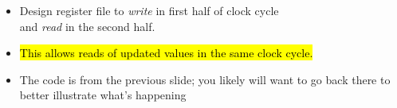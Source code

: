 \begin{frame}[fragile]
	\begin{itemize}
		\item Design register file to {\em write} in first half of clock cycle \\
			and {\em read} in the second half.


   \item \hl {This allows reads of updated values in the same clock cycle.}

	\end{itemize}
\BNotes\ifnum{}
\begin{itemize}
\item The code is from the previous slide; you likely will want to go back
	there to better illustrate what's happening
\end{itemize}
\fi\ENotes

\end{frame}


